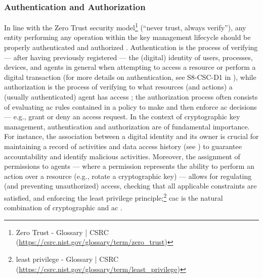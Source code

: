 \subsubsection{Authentication and Authorization}\label{sec:further:key_management:authn}

In line with the Zero Trust security model\footnote{Zero Trust - Glossary | CSRC (\url{https://csrc.nist.gov/glossary/term/zero\_trust})} (``never trust, always verify''), any entity performing any operation within the key management lifecycle should be properly authenticated and authorized \cite{chandramouli_cryptographic_2013}. Authentication is the process of verifying --- after having previously registered --- the (digital) identity of users, processes, devices, and agents in general when attempting to access a resource or perform a digital transaction (for more details on authentication, see S8-CSC-D1 in ), while authorization is the process of verifying to what resources (and actions) a (usually authenticated) agent has access \cite{samarati_access_2001}; the authorization process often consists of evaluating \gls{ac} rules contained in a policy to make and then enforce \gls{ac} decisions --- e.g., grant or deny an access request. In the context of cryptographic key management, authentication and authorization are of fundamental importance. For instance, the association between a digital identity and its owner is crucial for maintaining a record of activities and data access history (see ) to guarantee accountability and identify malicious activities. Moreover, the assignment of permissions to agents --- where a permission represents the ability to perform an action over a resource (e.g., rotate a cryptographic key) --- allows for regulating (and preventing unauthorized) access, checking that all applicable constraints are satisfied, and enforcing the least privilege principle;\footnote{least privilege - Glossary | CSRC (\url{https://csrc.nist.gov/glossary/term/least\_privilege})} \gls{cac} is the natural combination of cryptographic and \gls{ac} \cite{berlato_formal_2022,berlato_end_2022}.


